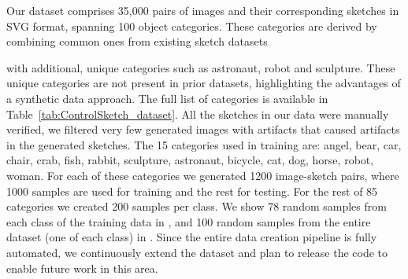 Our dataset comprises 35,000 pairs of images and their corresponding sketches in SVG format, spanning 100 object categories. These categories are derived by combining common ones from existing sketch datasets {\cite{Mukherjee2023SEVALS,SketchRNN,SketchyCOCO2020,Eitz2012HowDH} with additional, unique categories such as astronaut, robot and sculpture. These unique categories are not present in prior datasets, highlighting the advantages of a synthetic data approach. The full list of categories is available in Table~\ref{tab:ControlSketch_dataset}.
All the sketches in our data were manually verified, we filtered very few generated images with artifacts that caused artifacts in the generated sketches.
The 15 categories used in training are: angel, bear, car, chair, crab, fish, rabbit, sculpture, astronaut, bicycle, cat, dog, horse, robot, woman. For each of these categories we generated 1200 image-sketch pairs, where 1000 samples are used for training and the rest for testing.
For the rest of 85 categories we created 200 samples per class. 
We show 78 random samples from each class of the training data in , and 100 random samples from the entire dataset (one of each class) in .
Since the entire data creation pipeline is fully automated, we continuously extend the dataset and plan to release the code to enable future work in this area.

}
